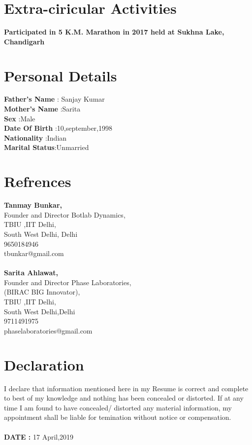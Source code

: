 \documentclass[11pt]{article}
\begin{document}
\section{Extra-ciricular Activities}
\textbf{ Participated in 5 K.M. Marathon in 2017 held at Sukhna Lake, Chandigarh}

\section{Personal Details}
\textbf{Father's Name} : Sanjay Kumar\\
\textbf{Mother's Name} :Sarita \\
\textbf{Sex}           :Male\\
\textbf{Date Of Birth} :10,september,1998\\
\textbf{Nationality}   :Indian\\
\textbf{Marital Status}:Unmarried\\

\section{Refrences}
\textbf{Tanmay Bunkar,}\\
Founder and Director Botlab Dynamics,\\
TBIU ,IIT Delhi,\\
South West Delhi, Delhi\\
9650184946\\
tbunkar@gmail.com\\\\
\textbf{Sarita Ahlawat,}\\
Founder and Director Phase Laboratories,\\
(BIRAC BIG Innovator),\\
TBIU ,IIT Delhi,\\
South West Delhi,Delhi\\
9711491975\\
phaselaboratories@gmail.com\\

\section{Declaration}
{I declare that information mentioned here in my Resume is correct and complete to best of my knowledge and nothing has been concealed or distorted. If at any time I am found to have concealed/ distorted any material information, my appointment shall be liable for temination without notice or compensation.}\\\\
\textbf{DATE :} 17 April,2019
\end{document}
